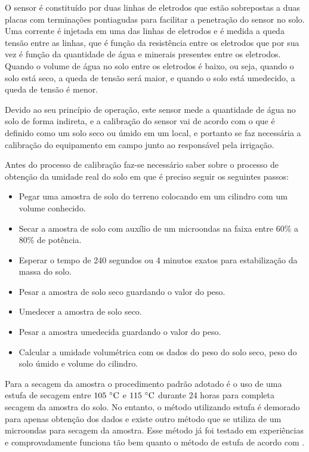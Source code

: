 		O sensor é constituído por duas linhas de eletrodos que estão
		sobrepostas a duas placas com terminações pontiagudas para facilitar a
		penetração do sensor no solo. Uma corrente é injetada em uma das linhas
		de eletrodos e é medida a queda tensão entre as linhas, que é função da
		resistência entre os eletrodos que por sua vez é função da quantidade de
		água e minerais presentes entre os eletrodos. Quando o volume de água no
		solo entre os eletrodos é baixo, ou seja, quando o solo está seco,
		a queda de tensão será maior, e quando o solo está umedecido,
		a queda de tensão é menor.

		Devido ao seu princípio de operação, este sensor mede a quantidade de
		água no solo de forma indireta, e a calibração do sensor vai de acordo
		com o que é definido como um solo seco ou úmido em um local, e portanto
		se faz necessária a calibração do equipamento em campo junto ao
		responsável pela irrigação.

		Antes do processo de calibração faz-se necessário saber sobre o processo de obtenção
		da umidade real do solo em que é preciso seguir os seguintes passos:

		\begin{itemize}
			\item Pegar uma amostra de solo do terreno colocando em um cilindro com um volume conhecido.
			\item Secar a amostra de solo com auxílio de um microondas na faixa entre 60\% a 80\% de potência.
			\item Esperar o tempo de 240 segundos ou 4 minutos exatos para estabilização da massa do solo.
			\item Pesar a amostra de solo seco guardando o valor do peso.
			\item Umedecer a amostra de solo seco.
			\item Pesar a amostra umedecida guardando o valor do peso.
			\item Calcular a umidade volumétrica com os dados do peso do solo seco, peso do solo úmido e volume do cilindro.
		\end{itemize}

		Para a secagem da amostra o procedimento padrão adotado é o uso de uma estufa de
		secagem entre $105~\celsius$ e $115~\celsius$ durante 24 horas para completa secagem da
		amostra do solo. No entanto, o método utilizando estufa é demorado para apenas
		obtenção dos dados e existe outro método que se utiliza de um microondas para
		secagem da amostra. Esse método já foi testado em experiências e comprovadamente
		funciona tão bem quanto o método de estufa de acordo com .


